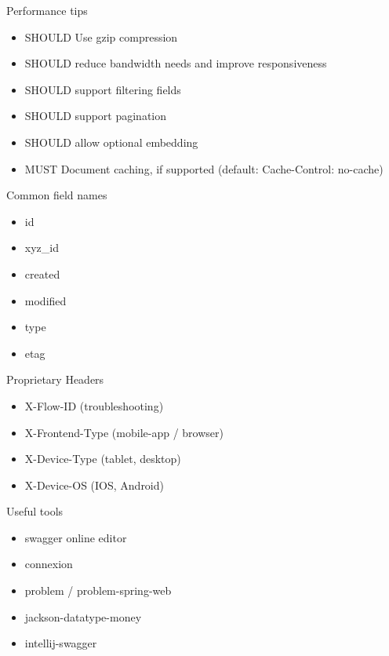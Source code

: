 \documentclass[10pt]{beamer}
\begin{document}
\begin{frame}{Performance tips}
  \begin{itemize}
    \item SHOULD Use gzip compression
    \item SHOULD reduce bandwidth needs and improve responsiveness
    \item SHOULD support filtering fields
    \item SHOULD support pagination
    \item SHOULD allow optional embedding
    \item MUST Document caching, if supported (default: Cache-Control: no-cache)
  \end{itemize}
\end{frame}

\begin{frame}{Common field names}
  \begin{itemize}
    \item id
    \item xyz\_id
    \item created
    \item modified
    \item type
    \item etag
  \end{itemize}

\end{frame}

\begin{frame}{Proprietary Headers}
  \begin{itemize}
    \item X-Flow-ID (troubleshooting)
    \item X-Frontend-Type (mobile-app / browser)
    \item X-Device-Type (tablet, desktop)
    \item X-Device-OS (IOS, Android)
  \end{itemize}
\end{frame}

\begin{frame}{Useful tools}
  \begin{itemize}
    \item swagger online editor
    \item connexion
    \item problem / problem-spring-web
    \item jackson-datatype-money
    \item intellij-swagger
  \end{itemize}
\end{frame}
\end{document}
